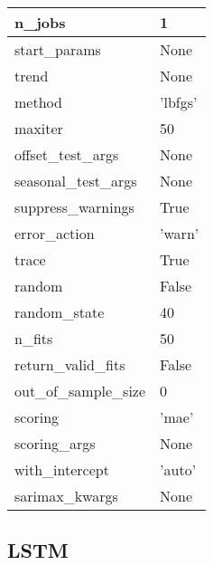 \begin{table}[h]
\begin{tabular}{|l|l|}
    n\_jobs                & 1       \\ \hline
    start\_params          & None    \\ \hline
    trend                  & None    \\ \hline
    method                 & 'lbfgs' \\ \hline
    maxiter                & 50      \\ \hline
    offset\_test\_args     & None    \\ \hline
    seasonal\_test\_args   & None    \\ \hline
    suppress\_warnings     & True    \\ \hline
    error\_action          & 'warn' \\ \hline
    trace                  & True   \\ \hline
    random                 & False   \\ \hline
    random\_state          & 40    \\ \hline
    n\_fits                & 50      \\ \hline
    return\_valid\_fits    & False   \\ \hline
    out\_of\_sample\_size  & 0       \\ \hline
    scoring                & 'mae'   \\ \hline
    scoring\_args          & None    \\ \hline
    with\_intercept        & 'auto'  \\ \hline
    sarimax\_kwargs        & None    \\ \hline
  \end{tabular}
\end{table}


\subsection{LSTM}

